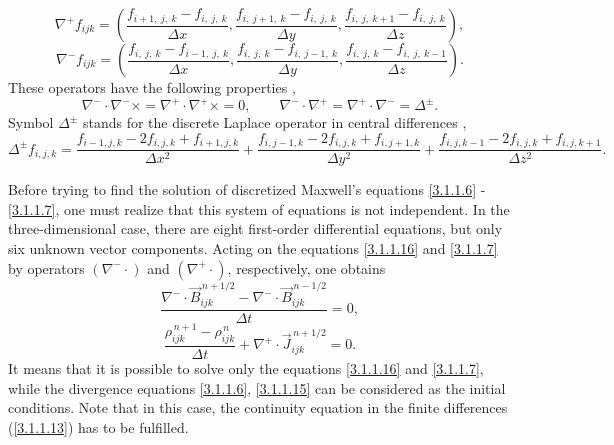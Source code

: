 \begin{equation}
\label{3.1.1.8}
\nabla^{+} f_{i j k} = \left(\frac{f_{i + 1,\: j,\: k} - f_{i,\: j,\: k}}{\Delta x}, \frac{f_{i,\: j + 1,\: k} - f_{i,\: j,\: k}}{\Delta y}, \frac{f_{i,\: j,\: k + 1} - f_{i,\: j,\: k}}{\Delta z} \right), 
\end{equation}
\begin{equation}
\label{3.1.1.9}
\nabla^{-} f_{i j k} = \left(\frac{f_{i,\: j,\: k} - f_{i - 1,\: j,\: k}}{\Delta x}, \frac{f_{i,\: j,\: k} - f_{i,\: j - 1,\: k}}{\Delta y}, \frac{f_{i,\: j,\: k} - f_{i,\: j,\: k - 1}}{\Delta z} \right).
\end{equation}
These operators have the following properties \cite{esirkepov},
\begin{equation}
\label{3.1.1.10}
\nabla^{-} \cdot \nabla^{-} \times = \nabla^{+} \cdot \nabla^{+} \times = 0, \qquad \nabla^{-} \cdot \nabla^{+} = \nabla^{+} \cdot \nabla^{-} = \Delta^{\pm}.
\end{equation}
Symbol $ \Delta^{\pm} $ stands for the discrete Laplace operator in central differences \cite{esirkepov},
\begin{equation}
\label{3.1.1.11}
\Delta^{\pm} f_{i, j, k} = \frac{f_{i - 1, j, k} - 2 f_{i, j, k} + f_{i + 1, j, k}}{\Delta x^{2}} + \frac{f_{i, j - 1, k} - 2 f_{i, j, k} + f_{i, j + 1, k}}{\Delta y^{2}} + \frac{f_{i, j, k - 1} - 2 f_{i, j, k} + f_{i, j, k + 1}}{\Delta z^{2}}.
\end{equation}

Before trying to find the solution of discretized Maxwell's equations \ref{3.1.1.6} - \ref{3.1.1.7}, one must realize that this system of equations is not independent. In the three-dimensional case, there are eight first-order differential equations, but only six unknown vector components. Acting on the equations \ref{3.1.1.16} and \ref{3.1.1.7} by operators $ \left(\nabla^{-}\cdot\right) $ and $ \left(\nabla^{+}\cdot\right) $, respectively, one obtains
\begin{equation}
\label{3.1.1.12}
\frac{\nabla^{-} \cdot \vec{B}_{ijk}^{\,n + 1/2} - \nabla^{-} \cdot \vec{B}_{ijk}^{\,n - 1/2}}{\Delta t} = 0,
\end{equation}
\begin{equation}
\label{3.1.1.13}
\frac{\rho_{ijk}^{\,n + 1} - \rho_{ijk}^{\,n}}{\Delta t} + \nabla^{+} \cdot \vec{J}_{ijk}^{\,n + 1/2} = 0.
\end{equation}
It means that it is possible to solve only the equations \ref{3.1.1.16} and \ref{3.1.1.7}, while the divergence equations \ref{3.1.1.6}, \ref{3.1.1.15} can be considered as the initial conditions. Note that in this case, the continuity equation in the finite differences (\ref{3.1.1.13}) has to be fulfilled.